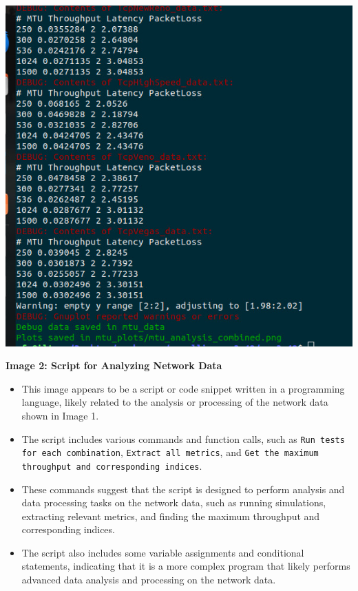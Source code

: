 \documentclass[11pt,a4paper]{article}
\begin{document}
\begin{tcolorbox}[colframe=blue!80!black, colback=blue!5!white, boxrule=0.4pt, width=\textwidth, sharp corners]
\begin{center}
    \includegraphics[width=1\columnwidth]{images/mtu-res.jpg}
\end{center}
\item \textbf{Image 2: Script for Analyzing Network Data}
\begin{itemize}
\item This image appears to be a script or code snippet written in a programming language, likely related to the analysis or processing of the network data shown in Image 1.
\item The script includes various commands and function calls, such as \texttt{Run tests for each combination}, \texttt{Extract all metrics}, and \texttt{Get the maximum throughput and corresponding indices}.
\item These commands suggest that the script is designed to perform analysis and data processing tasks on the network data, such as running simulations, extracting relevant metrics, and finding the maximum throughput and corresponding indices.
\item The script also includes some variable assignments and conditional statements, indicating that it is a more complex program that likely performs advanced data analysis and processing on the network data.
\end{itemize}

\end{tcolorbox}
\end{document}
